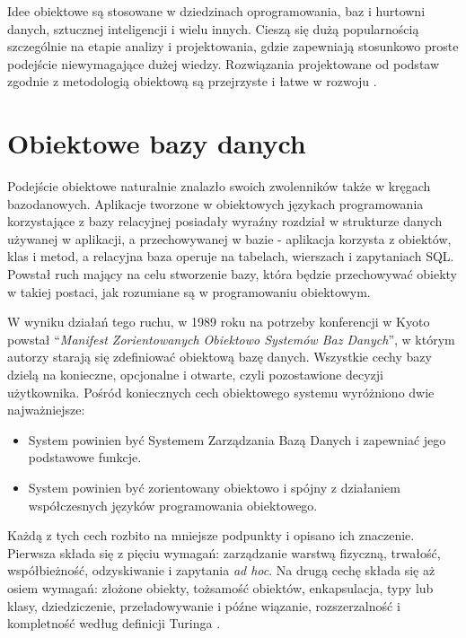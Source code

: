 \documentclass[a4paper,twoside,12pt]{book}
\begin{document}
Idee obiektowe są stosowane w dziedzinach oprogramowania, baz i hurtowni danych, sztucznej inteligencji i wielu innych. Cieszą się dużą popularnością szczególnie na etapie analizy i projektowania, gdzie zapewniają stosunkowo proste podejście niewymagające dużej wiedzy. Rozwiązania projektowane od podstaw zgodnie z metodologią obiektową są przejrzyste i łatwe w rozwoju \cite{bib:programowanie-zorientowane-obiektowo}. 

\section{Obiektowe bazy danych}

Podejście obiektowe naturalnie znalazło swoich zwolenników także w kręgach bazodanowych. Aplikacje tworzone w obiektowych językach programowania korzystające z bazy relacyjnej posiadały wyraźny rozdział w strukturze danych używanej w aplikacji, a przechowywanej w bazie - aplikacja korzysta z obiektów, klas i metod, a relacyjna baza operuje na tabelach, wierszach i zapytaniach SQL. Powstał ruch mający na celu stworzenie bazy, która będzie przechowywać obiekty w takiej postaci, jak rozumiane są w programowaniu obiektowym.

W wyniku działań tego ruchu, w 1989 roku na potrzeby konferencji w Kyoto powstał ``\textit{Manifest Zorientowanych Obiektowo Systemów Baz Danych}'', w którym autorzy starają się zdefiniować obiektową bazę danych. Wszystkie cechy bazy dzielą na konieczne, opcjonalne i otwarte, czyli pozostawione decyzji użytkownika. Pośród koniecznych cech obiektowego systemu wyróżniono dwie najważniejsze:  
\begin{itemize}
    \item System powinien być Systemem Zarządzania Bazą Danych i zapewniać jego podstawowe funkcje.
    \item System powinien być zorientowany obiektowo i spójny z działaniem współczesnych języków programowania obiektowego.
\end{itemize}

Każdą z tych cech rozbito na mniejsze podpunkty i opisano ich znaczenie. Pierwsza składa się z pięciu wymagań: zarządzanie warstwą fizyczną, trwałość, współbieżność, odzyskiwanie i zapytania \textit{ad hoc}. Na drugą cechę składa się aż osiem wymagań: złożone obiekty, tożsamość obiektów, enkapsulacja, typy lub klasy, dziedziczenie, przeładowywanie i późne wiązanie, rozszerzalność i kompletność według definicji Turinga \cite{bib:object-oriented-database-manifesto}.
\end{document}
